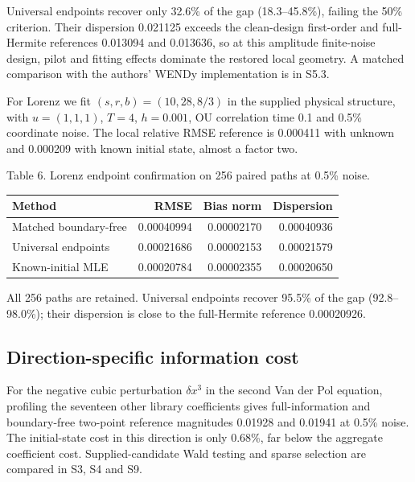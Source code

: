 \documentclass[ejs]{imsart}
\begin{document}
Universal endpoints recover only 32.6\% of the gap (18.3--45.8\%),
failing the 50\% criterion. Their dispersion 0.021125 exceeds the
clean-design first-order and full-Hermite references 0.013094 and
0.013636, so at this amplitude finite-noise design, pilot and fitting
effects dominate the restored local geometry. A matched comparison with
the authors' WENDy implementation is in S5.3.

For Lorenz we fit \((s,r,b)=(10,28,8/3)\) in the supplied physical
structure, with \(u=(1,1,1)\), \(T=4\), \(h=0.001\), OU correlation time
0.1 and 0.5\% coordinate noise. The local relative RMSE reference is
0.000411 with unknown and 0.000209 with known initial state, almost a
factor two.

\begin{center}
\begin{minipage}{\linewidth}
Table 6. Lorenz endpoint confirmation on 256 paired paths at 0.5\%
noise.

\small\setlength{\tabcolsep}{3pt}
\begin{tabular}{@{}lrrr@{}}
\toprule\noalign{}
Method & RMSE & Bias norm & Dispersion \\
\midrule\noalign{}
Matched boundary-free & 0.00040994 & 0.00002170 & 0.00040936 \\
Universal endpoints & 0.00021686 & 0.00002153 & 0.00021579 \\
Known-initial MLE & 0.00020784 & 0.00002355 & 0.00020650 \\
\bottomrule
\end{tabular}
\end{minipage}
\end{center}

All 256 paths are retained. Universal endpoints recover 95.5\% of the
gap (92.8--98.0\%); their dispersion is close to the full-Hermite
reference 0.00020926.

\subsection{Direction-specific information
cost}\label{direction-specific-information-cost}

For the negative cubic perturbation \(\delta x^3\) in the second Van der
Pol equation, profiling the seventeen other library coefficients gives
full-information and boundary-free two-point reference magnitudes
0.01928 and 0.01941 at 0.5\% noise. The initial-state cost in this
direction is only 0.68\%, far below the aggregate coefficient cost.
Supplied-candidate Wald testing and sparse selection are compared in S3,
S4 and S9.
\end{document}

